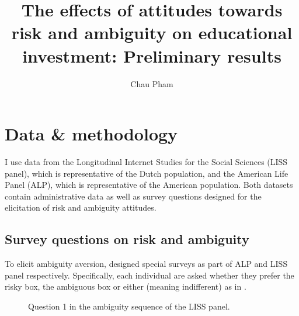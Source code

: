 \documentclass[]{article}
\title{The effects of attitudes towards risk and ambiguity on educational investment: Preliminary results}
\author{Chau Pham}
\begin{document}
\maketitle
\onehalfspacing

\section{Data \& methodology}
I use data from the Longitudinal Internet Studies for the Social Sciences (LISS panel), which is representative of the Dutch population, and the American Life Panel (ALP), which is representative of the American population. Both datasets contain administrative data as well as survey questions designed for the elicitation of risk and ambiguity attitudes.

\subsection{Survey questions on risk and ambiguity}
To elicit ambiguity aversion, \citet{DIMMOCK2016559, dimmock2016ambiguity} designed special surveys as part of ALP and LISS panel respectively. Specifically, each individual are asked whether they prefer the risky box, the ambiguous box or either (meaning indifferent) as in .

\begin{figure}[!htbp]
	\setlength{\fboxrule}{1.5pt}
	\setlength{\fboxsep}{0pt}
	\caption{Question 1 in the ambiguity sequence of the LISS panel.}
	\label{fig:1}
\end{figure}
\end{document}
